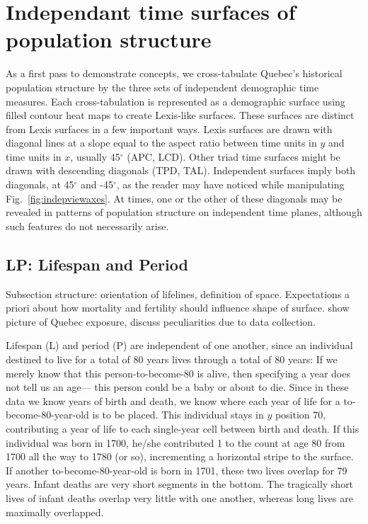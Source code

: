 \section{Independant time surfaces of population structure}
As a first pass to demonstrate concepts, we cross-tabulate Quebec's historical
population structure by the three sets of independent demographic time measures. Each
cross-tabulation is represented as a demographic surface using filled
contour heat maps to create Lexis-like surfaces. These surfaces are distinct
from Lexis surfaces in a few important ways. Lexis surfaces are drawn with
diagonal lines at a slope equal to the aspect ratio between time units in $y$
and time units in $x$, usually 45$^\circ$ (APC, LCD). Other triad time surfaces
might be drawn with descending diagonals (TPD, TAL). Independent surfaces
imply both diagonals, at 45$^\circ$ and -45$^\circ$, as the reader may have
noticed while manipulating Fig.~\ref{fig:indepviewaxes}. At times, one or the
other of these diagonals may be revealed in patterns of population structure on
independent time planes, although such features do not necessarily arise. 

\subsection{LP: Lifespan and Period}

Subsection structure: orientation of lifelines, definition of space.
Expectations a priori about how mortality and fertility should influence shape
of surface. show picture of Quebec exposure, discuss peculiarities due to data
collection.

Lifespan (L) and period (P) are independent of one another, since an individual
destined to live for a total of 80 years lives through a total of 80 years:
If we merely know that this person-to-become-80 is alive, then specifying a
year does not tell us an age--- this person could be a baby or about to
die. Since in these data we know years of birth and death, we know where each
year of life for a to-become-80-year-old is to be placed. This individual stays
in $y$ position 70, contributing a year of life to each single-year cell between
birth and death. If this individual was born in 1700, he/she contributed 1 to
the count at age 80 from 1700 all the way to 1780 (or so), incrementing a
horizontal stripe to the surface. If another to-become-80-year-old is born
in 1701, these two lives overlap for 79 years. Infant deaths are very short
segments in the bottom. The tragically short lives of infant deaths overlap very
little with one another, whereas long lives are maximally overlapped.

